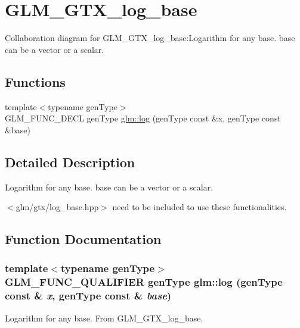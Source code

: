 \hypertarget{group__gtx__log__base}{
\section{GLM\_\-GTX\_\-log\_\-base}
\label{group__gtx__log__base}
}


Collaboration diagram for GLM\_\-GTX\_\-log\_\-base:Logarithm for any base. base can be a vector or a scalar.  
\subsection*{Functions}
\begin{CompactItemize}
\item 
{\footnotesize template$<$typename genType$>$ }\\GLM\_\-FUNC\_\-DECL genType \hyperlink{group__gtx__log__base_g62d0cda357eb4e0a3dc7d23241bbb66b}{glm::log} (genType const \&x, genType const \&base)
\end{CompactItemize}


\subsection{Detailed Description}
Logarithm for any base. base can be a vector or a scalar. 

$<$glm/gtx/log\_\-base.hpp$>$ need to be included to use these functionalities. 

\subsection{Function Documentation}
\hypertarget{group__gtx__log__base_g62d0cda357eb4e0a3dc7d23241bbb66b}{
\subsubsection[log]{\setlength{\rightskip}{0pt plus 5cm}template$<$typename genType$>$ GLM\_\-FUNC\_\-QUALIFIER genType glm::log (genType const \& {\em x}, \/  genType const \& {\em base})}}
\label{group__gtx__log__base_g62d0cda357eb4e0a3dc7d23241bbb66b}


Logarithm for any base. From GLM\_\-GTX\_\-log\_\-base. 
